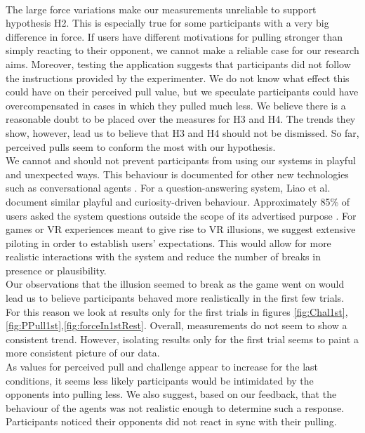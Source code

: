  \\
The large force variations make our measurements unreliable to support hypothesis H2. This is especially true for some participants with a very big difference in force. If users have different motivations for pulling stronger than simply reacting to their opponent, we cannot make a reliable case for our research aims. Moreover, testing the application suggests that participants did not follow the instructions provided by the experimenter. We do not know what effect this could have on their perceived pull value, but we speculate participants could have overcompensated in cases in which they pulled much less. We believe there is a reasonable doubt to be placed over the measures for H3 and H4. The trends they show, however, lead us to believe that H3 and H4 should not be dismissed. So far, perceived pulls seem to conform the most with our hypothesis.\\
We cannot and should not prevent participants from using our systems in playful and unexpected ways. This behaviour is documented for other new technologies such as conversational agents \cite{jain2018evaluating}. For a question-answering system, Liao et al. document similar playful and curiosity-driven behaviour. Approximately 85\% of users asked the system questions outside the scope of its advertised purpose \cite{ashktorab2019resilient}. For games or VR experiences meant to give rise to VR illusions, we suggest extensive piloting in order to establish users' expectations. This would allow for more realistic interactions with the system and reduce the number of breaks in presence or plausibility.  
\\
Our observations that the illusion seemed to break as the game went on would lead us to believe participants behaved more realistically in the first few trials. For this reason we look at results only for the first trials in figures \ref{fig:Chal1st},\ref{fig:PPull1st},\ref{fig:forceIn1stRest}. 	Overall, measurements do not seem to show a consistent trend. However, isolating results only for the first trial seems to paint a more consistent picture of our data. 
\\
As values for perceived pull and challenge appear to increase for the last conditions, it seems less likely participants would be intimidated by the opponents into pulling less. We also suggest, based on our feedback, that the behaviour of the agents was not realistic enough to determine such a response. Participants noticed their opponents did not react in sync with their pulling. 
\\
